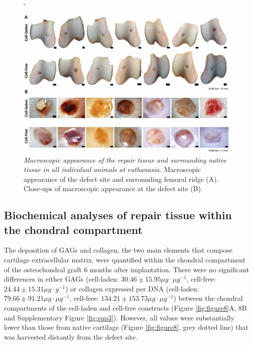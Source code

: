 \documentclass[twocolumn, empirical, authordate, issue]{jote-new-article}
\begin{document}
\begin{figure}[h!]
\begin{adjustwidth}{-\fullwidthlen}{}

\centering \includegraphics[width=\columnwidth+\fullwidthlen]{media/image7.jpg}
\caption{\emph{Macroscopic appearance of the repair tissue and surrounding native tissue in all individual animals at euthanasia.} Macroscopic appearance of the defect site and surrounding femoral ridge (A). Close-ups of macroscopic appearance at the defect site (B).}
\label{fig:figure7}
\end{adjustwidth}

\end{figure}


\subsection{Biochemical analyses of repair tissue within the chondral compartment} 

The deposition of GAGs and collagen, the two main elements that compose cartilage extracellular matrix, were quantified within the chondral compartment of the osteochondral graft 6 months after implantation. There were no significant differences in either GAGs (cell-laden: $30.46 \pm 15.95 \mu g\cdot\mu g^{-1}$, cell-free: $24.44 \pm 15.31 \mu g\cdot g^{-1}$) or collagen expressed per DNA (cell-laden: $79.66 \pm 91.21 \mu g\cdot\mu g^{-1}$, cell-free: $134.21\pm 153.73 \mu g\cdot\mu g^{-1}$) between the chondral compartments of the cell-laden and cell-free constructs (Figure \ref{fig:figure8}A, 8B and Supplementary Figure \ref{fig:sup3}). However, all values were substantially lower than those from native cartilage (Figure \ref{fig:figure8}, grey dotted line) that was harvested distantly from the defect site.
\end{document}
